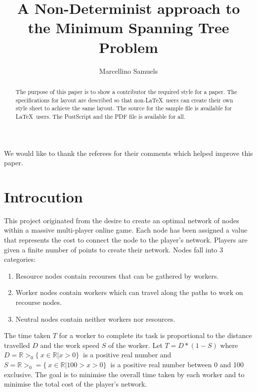 \documentclass{AISB2008}
\begin{document}
\title{A Non-Determinist approach to the Minimum Spanning Tree Problem}

\author{Marcellino Samuels }

\maketitle



\begin{abstract}
The purpose of this paper is to show a contributor the required
style for a paper. The specifications
for layout are described so that non-\LaTeX\ users can create their
own style sheet to achieve the same layout. The source for the
sample file is available for \LaTeX\ users. The PostScript and the
PDF file is available for all.
\end{abstract}

\ack
We would like to thank the referees for their comments which helped improve
this paper.

\tableofcontents

\section{Introcution}


This project originated from the desire to create an optimal network of nodes within a massive multi-player online game. Each node has been assigned a value that represents the cost to connect the node to the player’s network. Players are given a finite number of points to create their network. Nodes fall into 3 categories:

\begin{enumerate}
\item Resource nodes contain recourses that can be gathered by workers.
\item Worker nodes contain workers which can travel along the paths to work on recourse nodes.
\item Neutral nodes contain neither workers nor resources.
\end {enumerate}

The time taken {$T$} for a worker to complete its task is proportional to the distance travelled {$D$} and the work speed {$S$} of the worker. Let {$T = D * (1 - S)$} where {$D = {\mathbb{R}}>_0 \{\ x \in {\mathbb{R} | x > 0\}\ }$} is a positive real number and {$S = {\mathbb{R}}>_0 = \{\ x \in {\mathbb{R}} | 100 > x > 0 \}\  $} is a positive real number between 0 and 100 exclusive. The goal is to minimise the overall time taken by each worker and to minimise the total cost of the player’s network.
\end{document}
